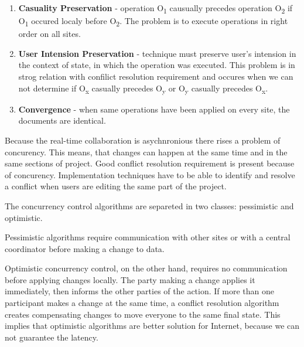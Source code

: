 \documentclass[12pt,oneside,draft]{fithesis2}
\begin{document}
\begin{enumerate}
\item \textbf{Casuality Preservation} - operation O\textsubscript{1} causually precedes operation O\textsubscript{2} if O\textsubscript{1} occured localy before O\textsubscript{2}. The problem is to execute operations in right order on all sites.
\item \textbf{User Intension Preservation} - technique must preserve user's intension in the context of state, in which the operation was executed. This problem is in strog relation with confilict resolution requirement and occures when we can not determine if O\textsubscript{x} casually precedes O\textsubscript{y} or O\textsubscript{y} casually precedes O\textsubscript{x}.
\item \textbf{Convergence} - when same operations have been applied on every site, the documents are identical.
\end{enumerate}
\par Because the real-time collaboration is asychnronious there rises a problem of concurency. This means, that changes can happen at the same time and in the same sections of project. Good conflict resolution requirement is present because of concurency. Implementation techniques have to be able to identify and resolve a conflict when users are editing the same part of the project. \par The concurrency control algorithms are separeted in two classes: pessimistic and optimistic. \par Pessimistic algorithms require communication with other sites or with a central coordinator before making a change to data. \par Optimistic concurrency control, on the other hand, requires no communication before applying changes locally. The party making a change applies it immediately, then informs the other parties of the action. If more than one participant makes a change at the same time, a conflict resolution algorithm creates compensating changes to move everyone to the same final state.\cite{Jupiter} This implies that optimistic algorithms are better solution for Internet, because we can not guarantee the latency.
\end{document}
